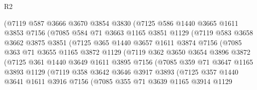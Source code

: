 \begin{lexlean}{R2}
\begin{coremodule}
              (@7119
                @587
                @3666
                @3670
                @3854
                @3830
                (@7125
                  @586
                  @1440
                  @3665
                  @1611
                  @3853
                  @7156
                  (@7085
                    @584
                    @71
                    @3663
                    @1165
                    @3851
                    @1129
                    (@7119
                      @583
                      @3658
                      @3662
                      @3875
                      @3851
                      (@7125
                        @365
                        @1440
                        @3657
                        @1611
                        @3874
                        @7156
                        (@7085
                          @363
                          @71
                          @3655
                          @1165
                          @3872
                          @1129
                          (@7119
                            @362
                            @3650
                            @3654
                            @3896
                            @3872
                            (@7125
                              @361
                              @1440
                              @3649
                              @1611
                              @3895
                              @7156
                              (@7085
                                @359
                                @71
                                @3647
                                @1165
                                @3893
                                @1129
                                (@7119
                                  @358
                                  @3642
                                  @3646
                                  @3917
                                  @3893
                                  (@7125
                                    @357
                                    @1440
                                    @3641
                                    @1611
                                    @3916
                                    @7156
                                    (@7085
                                      @355
                                      @71
                                      @3639
                                      @1165
                                      @3914
                                      @1129

\end{coremodule}
\end{lexlean}
